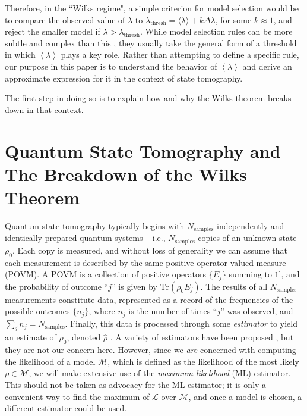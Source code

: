 \documentclass[aps,pra, twocolumn]{revtex4-1}
\newcommand{\M}{\mathcal{M}}
\newcommand{\Tr}{\mathrm{Tr}}
\newcommand{\cL}{\mathcal{L}}
\newcommand{\Id}{\mathbb{I}}
\newcommand{\expect}[1]{\ensuremath{\left\langle#1\right\rangle}}
\def\Id{1\!\mathrm{l}}
\begin{document}
Therefore, in the ``Wilks regime", a simple criterion for model selection would be to compare the observed value of $\lambda$ to $\lambda_{\mathrm{thresh}} = \langle \lambda \rangle + k\Delta \lambda$, for some $k \approx 1$, and reject the smaller model if $\lambda > \lambda_{\mathrm{thresh}}$.  While model selection rules can be more subtle and complex than this \cite{Akaike1974, Schwarz1978, Kass1995, Spiegelhalter2002}, they usually take the general form of a threshold in which $\expect{\lambda}$ plays a key role.  Rather than attempting to define a specific rule, our purpose in this paper is to understand the behavior of $\expect{\lambda}$ and derive an approximate expression for it in the context of state tomography.

The first step in doing so is to explain how and why the Wilks theorem breaks down in that context.

\section{Quantum State Tomography and The Breakdown of the Wilks Theorem}
\label{sec:qstmodelselection}
Quantum state tomography typically begins with $N_{\mathrm{samples}}$ independently and identically prepared quantum systems -- i.e., $N_{\mathrm{samples}}$ copies of an unknown state $\rho_{0}$.  Each copy is measured, and without loss of generality we can assume that each measurement is described by the same positive operator-valued measure (POVM).  A POVM is a collection of positive operators $\{E_j\}$ summing to $\Id$, and the probability of outcome ``$j$'' is given by $\Tr(\rho_0 E_j)$.  The results of all $N_{\mathrm{samples}}$ measurements constitute data, represented as a record of the frequencies of the possible outcomes $\{n_{j}\}$, where $n_{j}$ is the number of times ``$j$'' was observed, and $\sum_{j}n_{j} = N_{\mathrm{samples}}$.  Finally, this data is processed through some \emph{estimator} to yield an estimate of $\rho_0$, denoted $\hat{\rho}$ .  A variety of estimators have been proposed \cite{Vogel1989,Hradil1997,JamesPRA2001,Blume-Kohout2010b,Blume-Kohout2010,Zhu2014a,Ferrie2016}, but they are not our concern here.  However, since we \emph{are} concerned with computing the likelihood of a model $\M$, which is defined as the likelihood of the most likely $\rho\in\M$, we will make extensive use of the \emph{maximum likelihood} (ML) estimator.  This should not be taken as advocacy for the ML estimator; it is only a convenient way to find the maximum of $\cL$ over $\M$, and once a model is chosen, a different estimator could be used.
\end{document}
